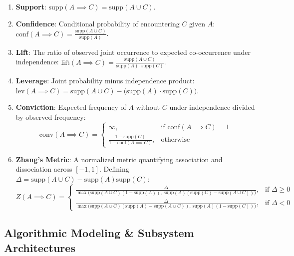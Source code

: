 \documentclass[11pt,a4paper]{article}
\begin{document}
\begin{enumerate}
    \item \textbf{Support}: $\text{supp}(A \implies C) = \text{supp}(A \cup C)$.
    \item \textbf{Confidence}: Conditional probability of encountering $C$ given $A$: $\text{conf}(A \implies C) = \frac{\text{supp}(A \cup C)}{\text{supp}(A)}$.
    \item \textbf{Lift}: The ratio of observed joint occurrence to expected co-occurrence under independence: $\text{lift}(A \implies C) = \frac{\text{supp}(A \cup C)}{\text{supp}(A) \cdot \text{supp}(C)}$.
    \item \textbf{Leverage}: Joint probability minus independence product: $\text{lev}(A \implies C) = \text{supp}(A \cup C) - \big(\text{supp}(A) \cdot \text{supp}(C)\big)$.
    \item \textbf{Conviction}: Expected frequency of $A$ without $C$ under independence divided by observed frequency:
    \begin{equation}
    \text{conv}(A \implies C) = \begin{cases}
    \infty, & \text{if } \text{conf}(A \implies C) = 1 \\
    \frac{1 - \text{supp}(C)}{1 - \text{conf}(A \implies C)}, & \text{otherwise}
    \end{cases}
    \end{equation}
    \item \textbf{Zhang's Metric}: A normalized metric quantifying association and dissociation across $[-1, 1]$. Defining $\Delta = \text{supp}(A \cup C) - \text{supp}(A)\text{supp}(C)$:
    \begin{equation}
    Z(A \implies C) = \begin{cases}
    \frac{\Delta}{\max\big(\text{supp}(A \cup C)(1 - \text{supp}(A)),\ \text{supp}(A)(\text{supp}(C) - \text{supp}(A \cup C))\big)}, & \text{if } \Delta \ge 0 \\
    \frac{\Delta}{\max\big(\text{supp}(A \cup C)(\text{supp}(A) - \text{supp}(A \cup C)),\ \text{supp}(A)(1 - \text{supp}(C))\big)}, & \text{if } \Delta < 0
    \end{cases}
    \end{equation}
\end{enumerate}

\subsection{Algorithmic Modeling \& Subsystem Architectures}
\end{document}
